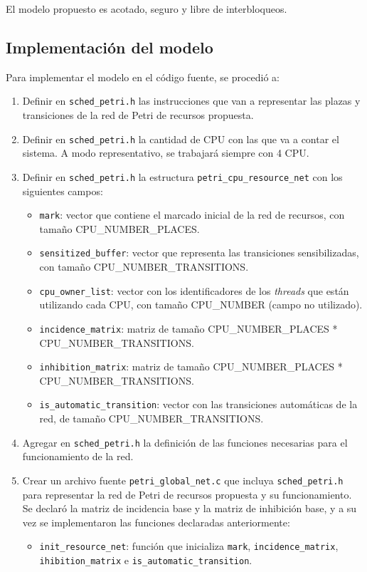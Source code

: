 \documentclass[a4paper]{book}
\begin{document}
El modelo propuesto es acotado, seguro y libre de interbloqueos.

\subsection{Implementaci\'on del modelo}
Para implementar el modelo en el c\'odigo fuente, se procedi\'o a:
\begin{enumerate}
\item Definir en \verb|sched_petri.h| las instrucciones que van a representar las plazas y transiciones de la red de Petri de recursos propuesta.
\item Definir en \verb|sched_petri.h| la cantidad de CPU con las que va a contar el sistema. A modo representativo, se trabajar\'a siempre con 4 CPU.
\item Definir en \verb|sched_petri.h| la estructura \verb|petri_cpu_resource_net| con los siguientes campos:
\begin{itemize}
\item \verb|mark|: vector que contiene el marcado inicial de la red de recursos, con tama\~no CPU\_NUMBER\_PLACES.
\item \verb|sensitized_buffer|: vector que representa las transiciones sensibilizadas, con tama\~no CPU\_NUMBER\_TRANSITIONS.
\item \verb|cpu_owner_list|: vector con los identificadores de los \emph{threads} que están utilizando cada CPU, con tama\~no CPU\_NUMBER (campo no utilizado).
\item \verb|incidence_matrix|: matriz de tama\~no CPU\_NUMBER\_PLACES * CPU\_NUMBER\_TRANSITIONS.
\item \verb|inhibition_matrix|: matriz de tama\~no CPU\_NUMBER\_PLACES * CPU\_NUMBER\_TRANSITIONS.
\item \verb|is_automatic_transition|: vector con las transiciones autom\'aticas de la red, de tama\~no CPU\_NUMBER\_TRANSITIONS.
\end{itemize}
\item Agregar en \verb|sched_petri.h| la definici\'on de las funciones necesarias para el funcionamiento de la red.
\item Crear un archivo fuente \verb|petri_global_net.c| que incluya \verb|sched_petri.h| para representar la red de Petri de recursos propuesta y su funcionamiento. Se declar\'o la matriz de incidencia base y la matriz de inhibici\'on base, y a su vez se implementaron las funciones declaradas anteriormente:
\begin{itemize}
\item \verb|init_resource_net|: funci\'on que inicializa \verb|mark|, \verb|incidence_matrix|, \verb|ihibition_matrix| e \verb|is_automatic_transition|.

\end{itemize}
\end{enumerate}
\end{document}
